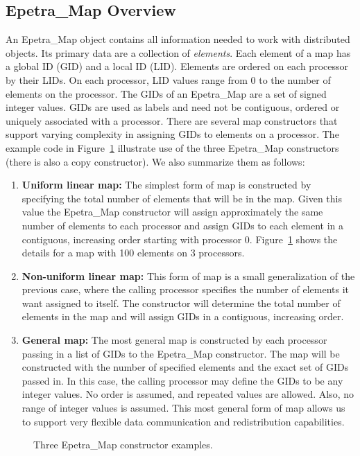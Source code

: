 \documentclass[12pt,relax]{EpetraUserGuide}
\newcommand{\map}{Epetra\_Map}
\begin{document}
\subsection{\map{} Overview}
An \map{} object contains all information needed to work with
distributed objects.  Its primary data are a collection of {\it
elements}.  Each element of a map has a global ID (GID) and a local ID
(LID).  Elements are ordered on each processor by their LIDs.  On each
processor, LID values range from 0 to the number of elements on the 
processor.  The GIDs
of an \map{} are a set of signed integer values.  GIDs are used as
labels and need not be contiguous, ordered or uniquely associated with
a processor.  There are several map constructors that support varying
complexity in assigning GIDs to elements on a processor.  The example
code in Figure~\ref{Figure:MapExamples} illustrate use of the three
\map{} constructors (there is also a copy constructor).  We also
summarize them as follows:
\begin{enumerate}
\item {\bf Uniform linear map:}  The simplest form of map is
constructed by specifying the total number of elements that will be in
the map.  Given this value the \map{} constructor will assign
approximately the same number of elements to each processor and assign
GIDs to each element in a contiguous, increasing order starting with
processor 0.  Figure~\ref{Figure:MapExamples} shows the details for a
map with 100 elements on 3 processors.
\item {\bf Non-uniform linear map:}  This form of map is a small
generalization of the previous case, 
where the calling processor specifies the number of
elements it want assigned to itself.  The constructor will determine
the total number of elements in the map and will assign GIDs in a
contiguous, increasing order.
\item {\bf General map:} The most general map is constructed by each
processor passing in a list of GIDs to the \map{} constructor.  The
map will be constructed with the number of specified elements and the
exact set of GIDs passed in.  In this case, the calling processor may
define the GIDs to be any integer values.  No order is assumed, and
repeated values are allowed.  Also, no range of integer values is
assumed.  This most general form of map allows us to support very
flexible data communication and redistribution capabilities.
\end{enumerate}
\begin{figure}
\begin{center}

\end{center}
\caption{\label{Figure:MapExamples} Three \map{} constructor examples.}
\end{figure}
\end{document}
